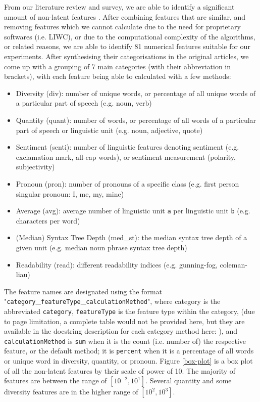 \documentclass{article}
\begin{document}
 \label{section:non-latent-feat}
From our literature review and survey, we are able to identify a significant amount of non-latent features \cite{zhou2020survey, garg2022linguistic, horne2017}. After combining features that are similar, and removing features which we cannot calculate due to the need for proprietary softwares (i.e. LIWC), or due to the computational complexity of the algorithms, or related reasons, we are able to identify 81 numerical features suitable for our experiments. After synthesising their categorisations in the original articles, we come up with a grouping of 7 main categories (with their abbreviation in brackets), with each feature being able to calculated with a few methods:
\begin{itemize}
    \item Diversity (div): number of unique words, or percentage of all unique words of a particular part of speech (e.g. noun, verb)
    \item Quantity (quant): number of words, or percentage of all words of a particular part of speech or linguistic unit (e.g. noun, adjective, quote)
    \item Sentiment (senti): number of linguistic features denoting sentiment (e.g. exclamation mark, all-cap words), or sentiment measurement (polarity, subjectivity)
    \item Pronoun (pron): number of pronouns of a specific class (e.g. first person singular pronoun: I, me, my, mine)
    \item Average (avg): average number of linguistic unit \texttt{a} per linguistic unit \texttt{b} (e.g. characters per word)
    \item (Median) Syntax Tree Depth (med\_st): the median syntax tree depth of a given unit (e.g. median noun phrase syntax tree depth)
    \item Readability (read): different readability indices (e.g. gunning-fog, coleman-liau)
\end{itemize}

The feature names are designated using the format "\texttt{category}\_\texttt{featureType}\_\texttt{calculationMethod}", where category is the abbreviated \texttt{category}, \texttt{featureType} is the feature type within the category, (due to page limitation, a complete table would not be provided here, but they are available in the docstring description for each category method here: \cite{ducknewsreporters-nonlatent}), and \texttt{calculationMethod} is \texttt{sum} when it is the count (i.e. number of) the respective feature, or the default method; it is \texttt{percent} when it is a percentage of all words or unique word in diversity, quantity, or pronoun. Figure \ref{box-plot} is a box plot of all the non-latent features by their scale of power of 10. The majority of features are between the range of $[10^{-2}, 10^{1}]$. Several quantity and some diversity features are in the higher range of $[10^2, 10^3]$. 
\end{document}
